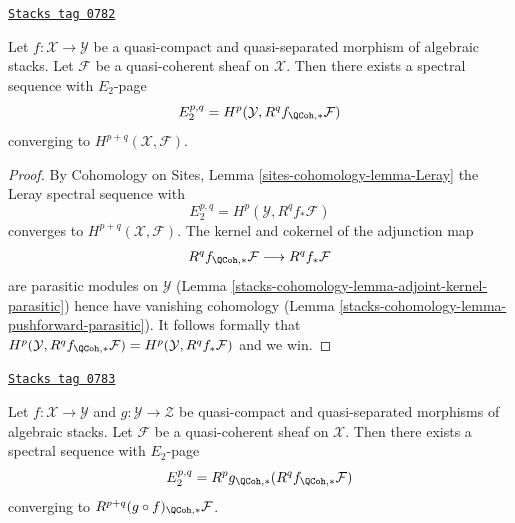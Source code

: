 \begin{lemma}[Leray]
\label{stacks-cohomology-lemma-leray}
\href{https://stacks.math.columbia.edu/tag/0782}{\texttt{Stacks tag 0782}}

Let $f : \mathcal{X} \to \mathcal{Y}$
be a quasi-compact and quasi-separated morphism of algebraic stacks.
Let $\mathcal{F}$ be a quasi-coherent sheaf on $\mathcal{X}$. Then
there exists a spectral sequence with $E_2$-page
$$
E_2^{p, q} = H^p(\mathcal{Y}, R^qf_{\QCoh, *}\mathcal{F})
$$
converging to $H^{p + q}(\mathcal{X}, \mathcal{F})$.
\end{lemma}

\begin{proof}
By Cohomology on Sites, Lemma \ref{sites-cohomology-lemma-Leray}
the Leray spectral sequence with
$$
E_2^{p, q} = H^p(\mathcal{Y}, R^qf_*\mathcal{F})
$$
converges to $H^{p + q}(\mathcal{X}, \mathcal{F})$. The kernel and cokernel
of the adjunction map
$$
R^qf_{\QCoh, *}\mathcal{F} \longrightarrow R^qf_*\mathcal{F}
$$
are parasitic modules on $\mathcal{Y}$
(Lemma \ref{stacks-cohomology-lemma-adjoint-kernel-parasitic})
hence have vanishing cohomology
(Lemma \ref{stacks-cohomology-lemma-pushforward-parasitic}).
It follows formally that
$H^p(\mathcal{Y}, R^qf_{\QCoh, *}\mathcal{F}) =
H^p(\mathcal{Y}, R^qf_*\mathcal{F})$ and we win.
\end{proof}

\begin{lemma}
\label{stacks-cohomology-lemma-relative-leray}
\href{https://stacks.math.columbia.edu/tag/0783}{\texttt{Stacks tag 0783}}

Let $f : \mathcal{X} \to \mathcal{Y}$ and $g : \mathcal{Y} \to \mathcal{Z}$
be quasi-compact and quasi-separated morphisms of algebraic stacks.
Let $\mathcal{F}$ be a quasi-coherent sheaf on $\mathcal{X}$. Then
there exists a spectral sequence with $E_2$-page
$$
E_2^{p, q} = R^pg_{\QCoh, *}(R^qf_{\QCoh, *}\mathcal{F})
$$
converging to $R^{p + q}(g \circ f)_{\QCoh, *}\mathcal{F}$.
\end{lemma}


